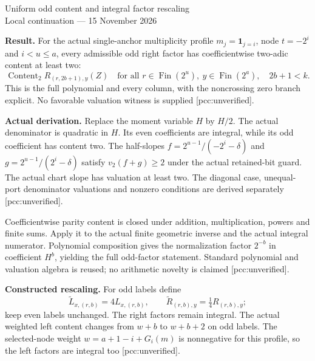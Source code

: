 \documentclass[10pt]{article}
\begin{document}
\begin{center}{\Large Uniform odd content and integral factor rescaling}\\[4pt]
Local continuation --- 15 November 2026\end{center}
\textbf{Result.} For the actual single-anchor multiplicity profile
$m_j=\mathbf1_{j=i}$, node $t=-2^i$ and $i<u\le a$, every admissible
odd right factor has coefficientwise two-adic content at least two:
\[
 \operatorname{Content}_2 R_{(r,2b+1),y}(Z)
 \quad\text{for all }r\in\operatorname{Fin}(2^u),\ y\in\operatorname{Fin}(2^a),\quad 2b+1<k.
\]
This is the full polynomial and every column, with the noncrossing zero
branch explicit. No favorable valuation witness is supplied [pcc:unverified].

\textbf{Actual derivation.} Replace the moment variable $H$ by $H/2$.
The actual denominator is quadratic in $H$. Its even coefficients are
integral, while its odd coefficient has content two. The half-slopes
$f=2^{u-1}/(-2^i-\delta)$ and $g=2^{u-1}/(2^i-\delta)$ satisfy
$v_2(f+g)\ge2$ under the actual retained-bit guard. The actual chart slope
has valuation at least two. The diagonal case, unequal-port denominator
valuations and nonzero conditions are derived separately [pcc:unverified].

Coefficientwise parity content is closed under addition, multiplication,
powers and finite sums. Apply it to the actual finite geometric inverse
and the actual integral numerator. Polynomial composition gives the
normalization factor $2^{-b}$ in coefficient $H^b$, yielding the full
odd-factor statement. Standard polynomial and valuation algebra is reused;
no arithmetic novelty is claimed [pcc:unverified].

\textbf{Constructed rescaling.} For odd labels define
\[
 \widetilde L_{x,(r,b)}=4L_{x,(r,b)},\qquad
 \widetilde R_{(r,b),y}=\tfrac14R_{(r,b),y};
\]
keep even labels unchanged. The right factors remain integral. The actual
weighted left content changes from $w+b$ to $w+b+2$ on odd labels.
The selected-node weight $w=a+1-i+G_i(m)$ is nonnegative for this profile,
so the left factors are integral too [pcc:unverified].
\end{document}
